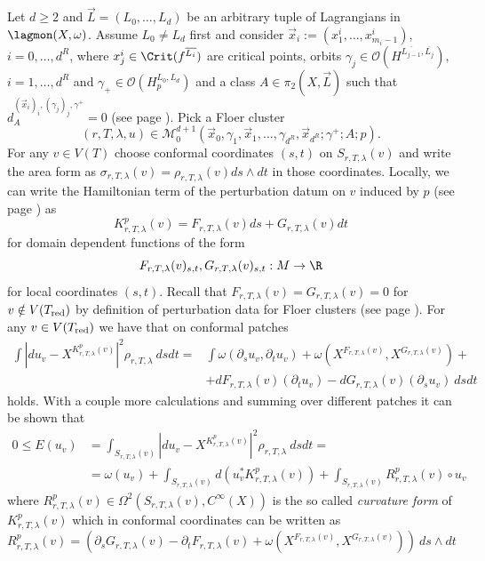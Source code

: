 	Let $d\geq 2$ and $\vec{L}=(L_0,\ldots,L_d)$ be an arbitrary tuple of Lagrangians in $\lagmon(X,\omega)$. Assume $L_0\neq L_d$ first and consider $\vec{x}_i:=(x^i_1,\ldots,x^i_{m_i-1})$, $i=0,\ldots,d^R$, where $x^i_j\in \Crit(f^{\overline{L_i}})$ are critical points, orbits $\gamma_j\in \mathcal{O}(H^{\overline{L_{j-1}},\overline{L_j}})$, $i=1,\ldots,d^R$ and $\gamma_+\in \mathcal{O}(H^{L_0,L_d}_p)$ and a class $A\in \pi_2(X,\vec{L})$ such that $d_{A}^{(\vec{x}_i)_i, (\gamma_j)_j,\gamma^+}=0$ (see page \pageref{tc1}). Pick a Floer cluster $$(r,T,\lambda, u)\in \mathcal{M}^{d+1}_0\left(\vec{x}_0, \gamma_1, \vec{x}_1,\ldots,\gamma_{d^R}, \vec{x}_{d^R}; \gamma^+;A;p\right).$$ For any $v\in V(T)$ choose conformal coordinates $(s,t)$ on $S_{r,T,\lambda}(v)$ and write the area form as $\sigma_{r,T,\lambda}(v)=\rho_{r,T,\lambda}(v)ds\wedge dt$ in those coordinates. Locally, we can write the Hamiltonian term of the perturbation datum on $v$ induced by $p$ (see page \pageref{pdgen2}) as $$K^p_{r,T,\lambda}(v)= F_{r,T,\lambda}(v)ds + G_{r,T,\lambda}(v)dt$$ for domain dependent functions of the form $$F_{r,T,\lambda}(v)_{s,t}, G_{r,T,\lambda}(v)_{s,t}: M\to \R$$ for local coordinates $(s,t)$. Recall that $F_{r,T,\lambda}(v)=G_{r,T,\lambda}(v)=0$ for $v\notin V(T_\textnormal{red})$ by definition of perturbation data for Floer clusters (see page \pageref{pdgen2}). For any $v\in V(T_\textnormal{red})$ we have that on conformal patches \begin{align*}
		\int|du_v-X^{K^p_{r,T,\lambda}(v)}|^2\rho_{r,T,\lambda} \ dsdt = & \int \omega(\partial_su_v, \partial_t u_v) + \omega(X^{F_{r,T,\lambda}(v)}, X^{G_{r,T,\lambda}(v)}) +\\ &+ dF_{r,T,\lambda}(v)(\partial_tu_v)- dG_{r,T,\lambda}(v)(\partial_s u_v)\ ds dt 
	\end{align*} holds.
	With a couple more calculations and summing over different patches it can be shown that \begin{align*}
		0\leq E(u_v) & = \int_{S_{r,T,\lambda}(v)}|du_v-X^{K^p_{r,T,\lambda}(v)}|^2\rho_{r,T,\lambda} \ dsdt = \\ & =\omega(u_v) + \int_{S_{r,T,\lambda}(v)}d(u_v^*K^p_{r,T,\lambda}(v)) + \int_{S_{r,T,\lambda}(v)} R^p_{r,T,\lambda}(v)\circ u_v
	\end{align*}
	where $R^p_{r,T,\lambda}(v)\in \Omega^2(S_{r,T,\lambda}(v),C^\infty(X))$ is the so called \textit{curvature form}\label{curvatureform} of $K^p_{r,T,\lambda}(v)$ which in conformal coordinates can be written as $$R^p_{r,T,\lambda}(v) = \left(\partial_sG_{r,T,\lambda}(v)-\partial_t F_{r,T,\lambda}(v) + \omega\left(X^{F_{r,T,\lambda}(v)},X^{G_{r,T,\lambda}(v)}\right)\right) \ ds\wedge dt$$
